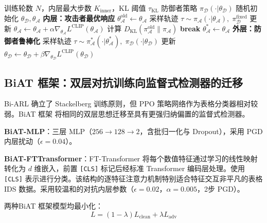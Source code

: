 \documentclass[12pt,a4paper]{ctexart}
\begin{document}
\begin{algorithm}[H]
\caption{双层对抗强化学习（Bi-ARL）}
\begin{algorithmic}[1]
\Require 训练轮数 $N$，内层最大步数 $K_{\text{inner}}$，KL 阈值 $\tau_{\text{KL}}$
\Ensure 防御者策略 $\pi_{\mathcal{D}}(\cdot|\theta_{\mathcal{D}})$
\State 随机初始化 $\theta_{\mathcal{D}}, \theta_{\mathcal{A}}$
    \State \textbf{内层：攻击者最优响应}
    \State $\theta_{\mathcal{A}}^{\text{old}}\leftarrow\theta_{\mathcal{A}}$
        \State 采样轨迹 $\tau \sim \pi_{\mathcal{A}}(\cdot|\theta_{\mathcal{A}}),\; \pi_{\mathcal{D}}^{\text{fixed}}$
        \State 更新 $\theta_{\mathcal{A}} \leftarrow \theta_{\mathcal{A}} + \alpha \nabla_{\theta_{\mathcal{A}}} L^{\text{CLIP}}(\theta_{\mathcal{A}})$
        \State 计算 $D_{\text{KL}}(\pi_{\mathcal{A}}^{\text{old}}\|\pi_{\mathcal{A}})$
            \State \textbf{break} 
        \EndIf
    \EndFor
    \State $\theta_{\mathcal{A}}^* \leftarrow \theta_{\mathcal{A}}$ 
    \State \textbf{外层：防御者鲁棒化}
    \State 采样轨迹 $\tau \sim \pi_{\mathcal{A}}^*(\cdot|\theta_{\mathcal{A}}^*),\; \pi_{\mathcal{D}}(\cdot|\theta_{\mathcal{D}})$
    \State 更新 $\theta_{\mathcal{D}} \leftarrow \theta_{\mathcal{D}} + \beta \nabla_{\theta_{\mathcal{D}}} L^{\text{CLIP}}(\theta_{\mathcal{D}})$
\EndFor
\end{algorithmic}
\end{algorithm}

\subsection{BiAT 框架：双层对抗训练向监督式检测器的迁移}
\label{sec:biat_cn}

Bi-ARL 确立了 Stackelberg 训练原则，但 PPO 策略网络作为表格分类器相对较弱。BiAT 框架 将相同的双层思想迁移至具有更强归纳偏置的监督式检测器。

\textbf{BiAT-MLP}：三层 MLP（$256\to128\to2$，含批归一化与 Dropout），采用 PGD 内层扰动（$\epsilon=0.04$）。

\textbf{BiAT-FTTransformer}：FT-Transformer 将每个数值特征通过学习的线性映射转化为 $d$ 维嵌入，前置 \texttt{[CLS]} 标记后经标准 Transformer 编码层处理。使用 \texttt{[CLS]} 表示进行分类。该结构的逐特征注意力机制特别适合特征交互非平凡的表格 IDS 数据。采用较温和的对抗内层参数（$\epsilon=0.02$，$\alpha=0.005$，2步 PGD）。

两种BiAT 框架模型均最小化：
\begin{equation}
L = (1-\lambda)L_{\text{clean}} + \lambda L_{\text{adv}}
\label{eq:biat_cn}
\end{equation}
\end{document}

